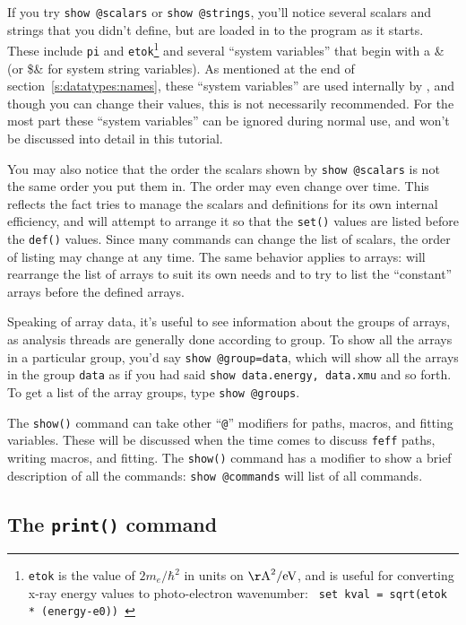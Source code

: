 \documentclass[11pt]{article}
\begin{document}
If you try {\tt{show @scalars}} or {\tt{show @strings}}, you'll notice
several scalars and strings that you didn't define, but are loaded in to
the program as it starts.  These include {\tt{pi}} and
{\tt{etok}}\footnote{{\tt{etok}} is the value of $2m_e/\hbar^2$ in units on
  $\rm {\AA}^2/eV$, and is useful for converting x-ray energy values to
  photo-electron wavenumber: {\tt{ set kval = sqrt(etok * (energy-e0)) }}}
and several ``system variables'' that begin with a {\&} (or \$\& for system
string variables).  As mentioned at the end of
section~\ref{s:datatypes:names}, these ``system variables'' are used
internally by {\ifeffit}, and though you can change their values, this is
not necessarily recommended.  For the most part these ``system variables''
can be ignored during normal use, and won't be discussed into detail in
this tutorial.

You may also notice that the order the scalars shown by {\tt{show
    @scalars}} is not the same order you put them in.  The order may even
change over time.  This reflects the fact {\ifeffit} tries to manage the
scalars and definitions for its own internal efficiency, and will attempt
to arrange it so that the {\tt{set()}} values are listed before the
{\tt{def()}} values.  Since many commands can change the list of scalars,
the order of listing may change at any time.  The same behavior applies to
arrays: {\ifeffit} will rearrange the list of arrays to suit its own needs
and to try to list the ``constant'' arrays before the defined arrays.

Speaking of array data, it's useful to see information about the groups of
arrays, as analysis threads are generally done according to group. To show
all the arrays in a particular group, you'd say {\tt{show @group=data}},
which will show all the arrays in the group {\tt{data}} as if you had said
{\tt{show data.energy, data.xmu}} and so forth.  To get a list of the array
groups, type {\tt{show @groups}}.

The {\tt{show()}} command can take other ``{\tt{@}}'' modifiers for {\feff}
paths, macros, and fitting variables.  These will be discussed when the
time comes to discuss {\tt{feff}} paths, writing macros, and fitting.  The
{\tt{show()}} command has a modifier to show a brief description of all the
commands: {\tt{show @commands}} will list of all commands.

\subsection{The {\tt{print()}} command}
\label{s:datatypes:print}
\end{document}
